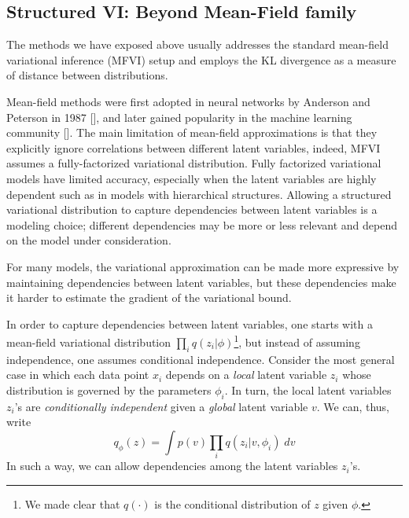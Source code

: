 \subsection{Structured VI: Beyond Mean-Field family}
The methods we have exposed above usually addresses the standard mean-field variational inference (MFVI) setup and employs the KL divergence as a measure of distance between distributions.

Mean-field methods were first adopted in neural networks by Anderson and Peterson in 1987 [\cite{Zhang2017}], and later gained popularity in the machine learning community [\cite{Jordan1999}]. The main limitation of mean-field approximations is that they explicitly ignore correlations between different latent variables, indeed, MFVI assumes a fully-factorized variational distribution. Fully factorized variational models have limited accuracy, especially when the latent variables are highly dependent such as in models with hierarchical structures. Allowing a structured variational distribution to capture dependencies between latent variables is a modeling choice; different dependencies may be more or less relevant and depend on the model under consideration.  

For many models, the variational approximation can be made more expressive by maintaining dependencies between latent variables, but these dependencies make it harder to estimate the gradient of the variational bound. 

In order to capture dependencies between latent variables, one starts with a mean-field variational distribution $\prod_i q(z_i|\phi)$\footnote{We made clear that $q(\cdot)$ is the conditional distribution of $z$ given $\phi$.}, but instead of assuming independence, one assumes conditional independence.  Consider the most general case in which each data point $x_i$ depends on a \textit{local} latent variable $z_i$ whose distribution is governed by the parameters $\phi_i$. In turn, the local latent variables $z_i$'s are \textit{conditionally independent} given a \textit{global} latent variable $v$. We can, thus, write
$$q_\phi(z) = \int p(v) \prod_i q(z_i|v, \phi_i) \; dv$$
In such a way, we can allow dependencies among the latent variables $z_i$'s.










